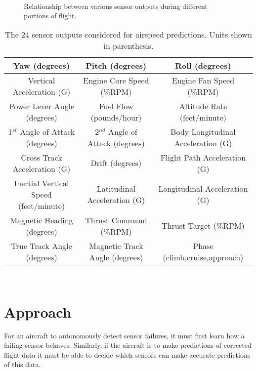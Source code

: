 \documentclass[]{aiaa-tc}
\begin{document}
\begin{figure}[h!]
    \centering
     ~\hfill
    ~\vfill
     ~\hfill
    ~\vfill
    \caption{Relationship between various sensor outputs during different portions of flight. }
    \label{fig:n1candff}
\end{figure}


\begin{table}
\centering
  \caption{\label{sensorList}The 24 sensor outputs considered for airspeed predictions. Units shown in parenthesis.}
  \begin{tabular}{ ccc }
    \hline
    \hline
    Yaw (degrees)& Pitch (degrees) & Roll (degrees)\\ \hline
    Vertical Acceleration (G)& Engine Core Speed (\%RPM)& Engine Fan Speed (\%RPM)\\ \hline
    Power Lever Angle (degrees)& Fuel Flow (pounds/hour)& Altitude Rate (feet/minute)\\ \hline
    1$^{st}$ Angle of Attack (degrees)& 2$^{nd}$ Angle of Attack (degrees)& Body Longitudinal Acceleration (G)\\ \hline
    Cross Track Acceleration (G)& Drift (degrees) & Flight Path Acceleration (G)\\ \hline
    Inertial Vertical Speed (feet/minute)& Latitudinal Acceleration (G) & Longitudinal Acceleration (G)\\ \hline
    Magnetic Heading (degrees)& Thrust Command (\%RPM)& Thrust Target (\%RPM)\\ \hline
    True Track Angle (degrees)& Magnetic Track Angle (degrees) & Phase (climb,cruise,approach)\\  \hline \hline
 \end{tabular}
\end{table}

~\vfill
\section{Approach }
\label{sec:approach}
For an aircraft to autonomously detect sensor failures, it must first learn how a failing sensor behaves. Similarly, if the aircraft is to make predictions of corrected flight data it must be able to decide which sensors can make accurate predictions of this data. 
\end{document}
